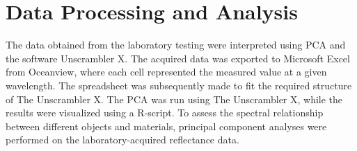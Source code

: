 \section{Data Processing and Analysis}
The data obtained from the laboratory testing were interpreted using PCA and the software Unscrambler X. The acquired data was exported to Microsoft Excel from Oceanview, where each cell represented the measured value at a given wavelength. The spreadsheet was subsequently made to fit the required structure of The Unscrambler X. The PCA was run using The Unscrambler X, while the results were visualized using a R-script. To assess the spectral relationship between different objects and materials, principal component analyses were performed on the laboratory-acquired reflectance data. 


